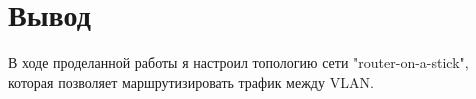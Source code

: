\chapter{Вывод}
В ходе проделанной работы я настроил топологию сети "router-on-a-stick", которая позволяет маршрутизировать трафик между
VLAN.
\endinput